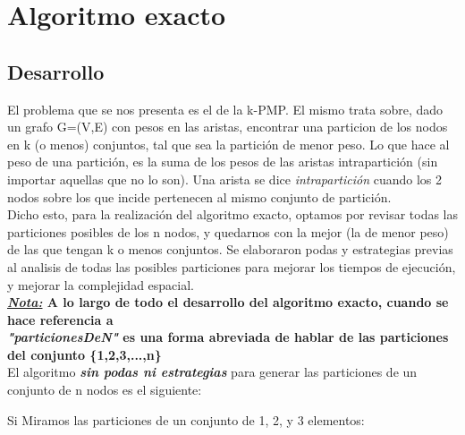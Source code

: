 \documentclass[10pt,a4paper]{article}
\begin{document}
\section{Algoritmo exacto}
\subsection{Desarrollo}
El problema que se nos presenta es el de la k-PMP. El mismo trata sobre, dado un grafo G=(V,E) con pesos en las aristas, encontrar una particion de los nodos en k (o menos) conjuntos, tal que sea la partición de menor peso.
Lo que hace al peso de una partición, es la suma de los pesos de las aristas intrapartición (sin importar aquellas que no lo son). Una arista se dice \textit{intrapartición} cuando los 2 nodos sobre los que incide pertenecen al mismo conjunto de partición.\\

Dicho esto, para la realización del algoritmo exacto, optamos por revisar todas las particiones posibles de los n nodos, y quedarnos con la mejor (la de menor peso) de las que tengan k o menos conjuntos.
Se elaboraron podas y estrategias previas al analisis de todas las posibles particiones para mejorar los tiempos de ejecución, y mejorar la complejidad espacial.\\

\textbf{\underline{\textit{Nota:}} A lo largo de todo el desarrollo del algoritmo exacto, cuando se hace referencia a\\ \textbf{\textit{"particionesDeN"}} es una forma abreviada de hablar de las particiones del conjunto \{1,2,3,...,n\}} \\

El algoritmo \textit{\textbf{sin podas ni estrategias}} para generar las particiones de un conjunto de n nodos es el siguiente:

Si Miramos las particiones de un conjunto de 1, 2, y 3 elementos:
\end{document}
